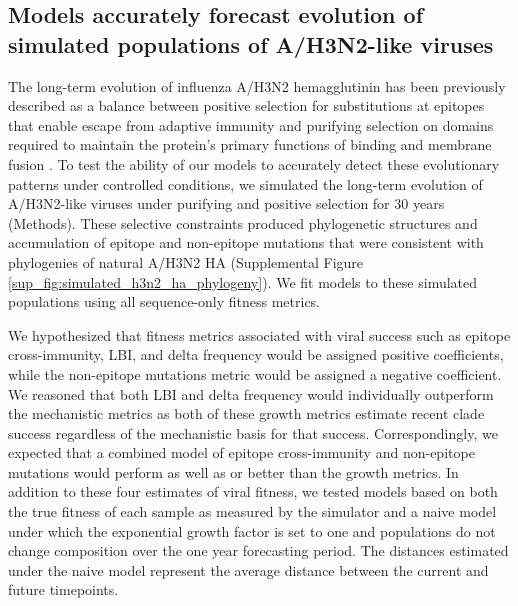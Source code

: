 \subsection*{Models accurately forecast evolution of simulated populations of {A/H3N2-like viruses}}

The long-term evolution of influenza A/H3N2 hemagglutinin has been previously described as a balance between positive selection for substitutions at epitopes that enable escape from adaptive immunity and purifying selection on domains required to maintain the protein's primary functions of binding and membrane fusion \cite{Bush:1999vj,Neher2013,Luksza:2014hj,Koelle:2015dh}.
To test the ability of our models to accurately detect these evolutionary patterns under controlled conditions, we simulated the long-term evolution of A/H3N2-like viruses under purifying and positive selection for 30 years (Methods).
These selective constraints produced phylogenetic structures and accumulation of epitope and non-epitope mutations that were consistent with phylogenies of natural A/H3N2 HA (Supplemental Figure \ref{sup_fig:simulated_h3n2_ha_phylogeny}).
We fit models to these simulated populations using all sequence-only fitness metrics.

We hypothesized that fitness metrics associated with viral success such as epitope cross-immunity, LBI, and delta frequency would be assigned positive coefficients, while the non-epitope mutations metric would be assigned a negative coefficient.
We reasoned that both LBI and delta frequency would individually outperform the mechanistic metrics as both of these growth metrics estimate recent clade success regardless of the mechanistic basis for that success.
Correspondingly, we expected that a combined model of epitope cross-immunity and non-epitope mutations would perform as well as or better than the growth metrics.
In addition to these four estimates of viral fitness, we tested models based on both the true fitness of each sample as measured by the simulator and a naive model under which the exponential growth factor is set to one and populations do not change composition over the one year forecasting period.
The distances estimated under the naive model represent the average distance between the current and future timepoints.

